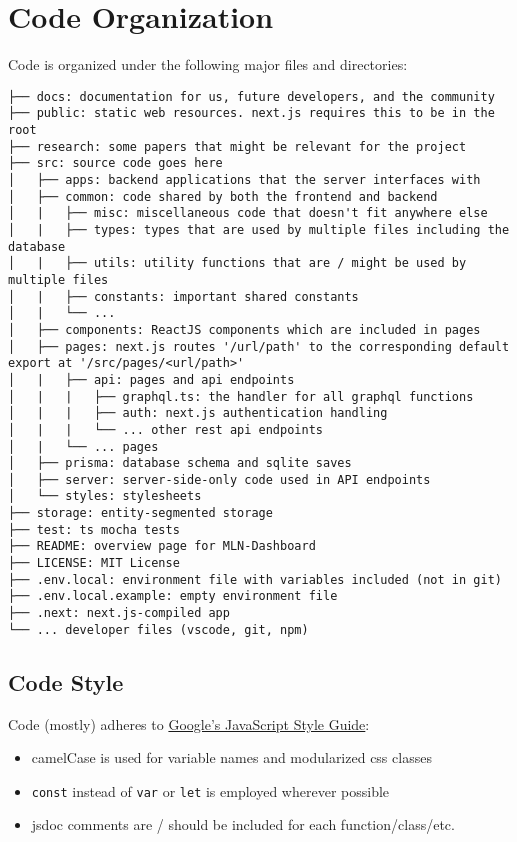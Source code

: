 \hypertarget{code-organization}{%
\section{Code Organization}\label{code-organization}}

Code is organized under the following major files and directories:

\begin{verbatim}
├── docs: documentation for us, future developers, and the community
├── public: static web resources. next.js requires this to be in the root
├── research: some papers that might be relevant for the project
├── src: source code goes here
│   ├── apps: backend applications that the server interfaces with
│   ├── common: code shared by both the frontend and backend
│   |   ├── misc: miscellaneous code that doesn't fit anywhere else
│   |   ├── types: types that are used by multiple files including the database
│   |   ├── utils: utility functions that are / might be used by multiple files
│   |   ├── constants: important shared constants
│   |   └── ...
│   ├── components: ReactJS components which are included in pages
│   ├── pages: next.js routes '/url/path' to the corresponding default export at '/src/pages/<url/path>'
│   |   ├── api: pages and api endpoints
│   |   |   ├── graphql.ts: the handler for all graphql functions
│   |   |   ├── auth: next.js authentication handling
│   |   |   └── ... other rest api endpoints
│   |   └── ... pages
│   ├── prisma: database schema and sqlite saves
│   ├── server: server-side-only code used in API endpoints
│   └── styles: stylesheets
├── storage: entity-segmented storage
├── test: ts mocha tests
├── README: overview page for MLN-Dashboard
├── LICENSE: MIT License
├── .env.local: environment file with variables included (not in git)
├── .env.local.example: empty environment file
├── .next: next.js-compiled app
└── ... developer files (vscode, git, npm)
\end{verbatim}

\hypertarget{code-style}{%
\subsection{Code Style}\label{code-style}}

Code (mostly) adheres to
\href{https://google.github.io/styleguide/jsguide.html}{Google's
JavaScript Style Guide}:

\begin{itemize}
\tightlist
\item
  camelCase is used for variable names and modularized css classes
\item
  \texttt{const} instead of \texttt{var} or \texttt{let} is employed
  wherever possible
\item
  jsdoc comments are / should be included for each function/class/etc.
\end{itemize}

